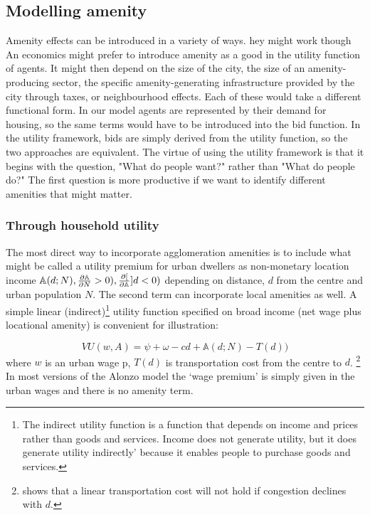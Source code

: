  
\subsection{Modelling amenity}
Amenity effects can be introduced in a variety of ways. hey might work though An economics might prefer to introduce amenity as a good in the utility function of agents. It might then depend on the size of the city, the size of an amenity-producing sector, the specific amenity-generating infrastructure provided by the city through taxes,  or neighbourhood effects. Each of these would take a different functional form. In our model agents are represented by their demand for housing, so the same terms would have to be introduced into the bid function. In the utility framework, bids are simply derived from the utility function, so the two approaches are equivalent. The virtue of using the utility framework is that it begins with the question, "What do people want?" rather than "What do people do?" The first question is more productive if we want to identify different amenities that might matter.

\subsubsection{Through household utility}
 The most direct way to incorporate agglomeration amenities is to include what might be called a \gls{utility premium} for urban dwellers as non-monetary location income $\mathbb{A}(d; N), \frac{\partial \mathbb{A}}{\partial N}> 0), \frac{\partial [}{\partial \mathbb{A}}]{d}< 0)$ depending on distance, $d$ from the centre and urban population $N$. The second term can incorporate local amenities as well. A simple linear (indirect)\footnote{The indirect utility function is a function that depends on income and prices rather than goods and services.  Income does not generate utility, but it does generate utility indirectly' because it enables people to purchase goods and services.} utility function specified on broad income (net wage plus locational amenity) is convenient for illustration:

\begin{equation}VU(w,A)= \psi+ \omega-cd + \mathbb{A}(d; N) - T(d))
\label{eqn-u}
\end{equation}
where $w$  is an urban wage p, $T(d)$ is transportation cost from the centre to $d$.
\footnote{\cite{anasUrbanSpatialStructure1998} shows that a linear transportation cost will not  hold if congestion declines  with $d$.} 
 In most versions of the Alonzo model the `wage premium' is simply given in the urban wages and there is no amenity term. 


